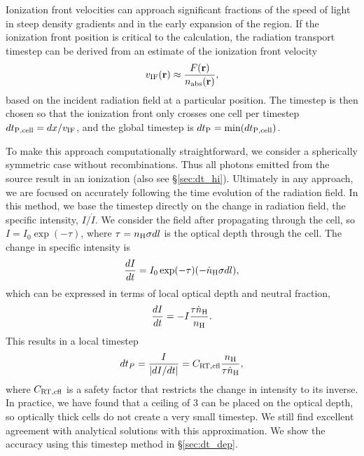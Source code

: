 \documentclass[12pt,preprint]{aastex}
\begin{document}
Ionization front velocities can approach significant fractions of the
speed of light in steep density gradients and in the early expansion
of the  region.  If the ionization front position is
critical to the calculation, the radiation transport timestep can be
derived from an estimate of the ionization front velocity
%
\begin{equation}
  \label{eqn:dt_incident}
  v_{\rm IF}(\mathbf{r}) \approx \frac{F(\mathbf{r})}
  {n_{\rm abs}(\mathbf{r})},
\end{equation}
%
based on the incident radiation field at a particular position.  The
timestep is then chosen so that the ionization front only crosses one
cell per timestep $dt_{\rm P, cell} = dx / v_{\rm IF}$, and the global
timestep is $dt_{\rm P} = \min(dt_{\rm P, cell})$.  

To make this approach computationally straightforward, we consider a
spherically symmetric case without recombinations.  Thus all photons
emitted from the source result in an ionization (also see
\S\ref{sec:dt_hi}).  Ultimately in any approach, we are focused on
accurately following the time evolution of the radiation field.  In
this method, we base the timestep directly on the change in radiation
field, the specific intensity, $I/\dot{I}$.  We consider the field
after propagating through the cell, so $I = I_0 \exp(-\tau)$, where
$\tau = n_{\rm H} \sigma dl$ is the optical depth through the cell.
The change in specific intensity is
%
\begin{equation}
  \label{eqn:vifront2}
    \frac{dI}{dt} = I_0 \exp(-\tau) (-\dot{n}_{\rm H} \sigma dl),
\end{equation}
%
which can be expressed in terms of local optical depth and neutral
fraction,
\begin{equation}
  \label{eqn:vifront3}
    \frac{dI}{dt} = -I \frac{\tau \dot{n}_{\rm H}}{n_{\rm H}}.
\end{equation}
%
This results in a local timestep
%
\begin{equation}
  \label{eqn:vifront4}
  dt_P = \frac{I}{|dI/dt|} = C_{\rm RT,cfl} \frac{n_{\rm H}}{\tau \dot{n}_{\rm H}},
\end{equation}
%
where $C_{\rm RT,cfl}$ is a safety factor that restricts the change in
intensity to its inverse.  In practice, we have found that a ceiling
of 3 can be placed on the optical depth, so optically thick cells do
not create a very small timestep.  We still find excellent agreement
with analytical solutions with this approximation.  We show the
accuracy using this timestep method in \S\ref{sec:dt_dep}.
\end{document}

